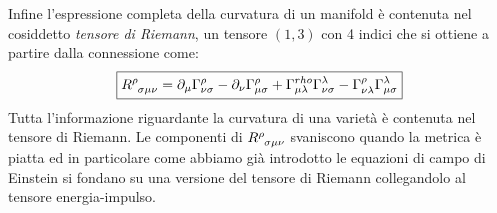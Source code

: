 \documentclass[twoside]{article}
\begin{document}
Infine l'espressione completa della curvatura di un manifold è contenuta nel cosiddetto \emph{tensore di Riemann}, un tensore $(1,3)$ con 4 indici che si ottiene a partire dalla connessione come:
\begin{equation}
	\boxed{
	R\indices{^{\rho}_{\sigma \mu \nu}} = \partial_{\mu} \Gamma^{\rho}_{\nu \sigma} - 
	\partial_\nu \Gamma^{\rho}_{\mu \sigma}
	+ \Gamma^{rho}_{\mu \lambda} \Gamma^{\lambda}_{\nu \sigma}
	- \Gamma^{\rho}_{\nu \lambda} \Gamma^{\lambda}_{\mu \sigma}
	}
\end{equation}
Tutta l'informazione riguardante la curvatura di una varietà è contenuta nel tensore di Riemann. Le componenti di $R\indices{^{\rho}_{\sigma \mu \nu}}$ svaniscono quando la metrica è piatta ed in particolare come abbiamo già introdotto le equazioni di campo di Einstein si fondano su una versione del tensore di Riemann collegandolo al tensore energia-impulso.
\end{document}
